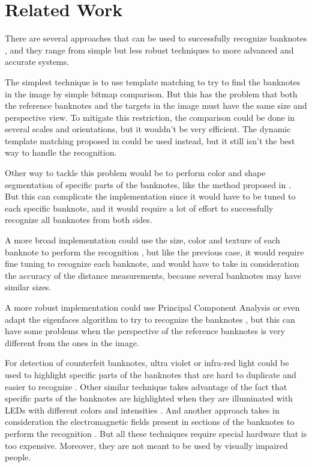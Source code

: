\section{Related Work}\label{sec:related-work}

There are several approaches that can be used to successfully recognize banknotes \cite{Pawade2013}, and they range from simple but less robust techniques to more advanced and accurate systems.

The simplest technique is to use template matching to try to find the banknotes in the image by simple bitmap comparison. But this has the problem that both the reference banknotes and the targets in the image must have the same size and perspective view. To mitigate this restriction, the comparison could be done in several scales and orientations, but it wouldn't be very efficient. The dynamic template matching proposed in \cite{Nishimura2009} could be used instead, but it still isn't the best way to handle the recognition.

Other way to tackle this problem would be to perform color and shape segmentation of specific parts of the banknotes, like the method proposed in \cite{Solymar2011}. But this can complicate the implementation since it would have to be tuned to each specific banknote, and it would require a lot of effort to successfully recognize all banknotes from both sides.

A more broad implementation could use the size, color and texture of each banknote to perform the recognition \cite{Hassanpour2007}, but like the previous case, it would require fine tuning to recognize each banknote, and would have to take in consideration the accuracy of the distance measurements, because several banknotes may have similar sizes.

A more robust implementation could use Principal Component Analysis or even adapt the eigenfaces algorithm to try to recognize the banknotes \cite{Grijalva2010}, but this can have some problems when the perspective of the reference banknotes is very different from the ones in the image.

For detection of counterfeit banknotes, ultra violet or infra-red light could be used to highlight specific parts of the banknotes that are hard to duplicate and easier to recognize \cite{Kim2013}. Other similar technique takes advantage of the fact that specific parts of the banknotes are highlighted when they are illuminated with LEDs with different colors and intensities \cite{Radvanyi2011}. And another approach takes in consideration the electromagnetic fields present in sections of the banknotes to perform the recognition \cite{Qian2011}. But all these techniques require special hardware that is too expensive. Moreover, they are not meant to be used by visually impaired people.

